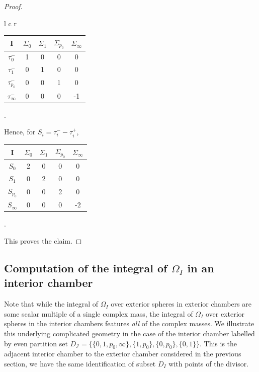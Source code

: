\documentclass[12pt,letterpaper,reqno]{amsart}
\theoremstyle{remark}
\theoremstyle{definition}
\numberwithin{thm}{section}
\numberwithin{equation}{section}
\numberwithin{figure}{section}
\begin{document}
\begin{proof}
\begin{center}
\begin{tabular}{l c r}
\begin{tabular}{  c | c | c |c|c }
    I & $\Sigma_0$ & $\Sigma_1$ & $\Sigma_{p_0}$ & $\Sigma_\infty$ \\ \hline
    $\tau_0^-$ & 1 & 0 & 0 & 0\\ \hline
    $\tau_1^-$ & 0 & 1 & 0 & 0\\ \hline
    $\tau_{p_0}^-$ & 0 & 0  & 1 & 0\\ \hline
    $\tau_\infty^-$ & 0 & 0  & 0 & -1\\
\end{tabular}.

\end{tabular}

\end{center}
Hence,  for $S_i = \tau_i^- - \tau_i^+$,
\begin{center}

 \begin{tabular}{  c | c | c |c|c }
    I & $\Sigma_0$ & $\Sigma_1$ & $\Sigma_{p_0}$ & $\Sigma_\infty$ \\ \hline
    $S_0$ & 2 & 0 & 0 & 0\\ \hline
    $S_1$ & 0 & 2 & 0 & 0\\ \hline
    $S_{p_0}$ & 0 & 0  & 2 & 0\\ \hline
    $S_\infty$ & 0 & 0  & 0 & -2 \\
\end{tabular}.
\end{center}
This proves the claim.
 \end{proof}
 

 \subsection{Computation of the integral of \texorpdfstring{$\Omega_I$}{the holomorphic symplectic form} in an interior chamber}
 
 Note that while the integral of $\Omega_I$ over exterior spheres in exterior chambers are some scalar multiple of a single complex mass, the integral of $\Omega_I$ over exterior spheres in the interior chambers features \emph{all} of the complex masses.  We illustrate this underlying complicated geometry in the case of the interior chamber labelled by even partition set $D_{\mathcal{I}}=\{\{0, 1, p_0, \infty\}, \{1, p_0\}, \{0, p_0\}, \{0, 1\}\}$.
This is the adjacent interior chamber to the exterior chamber considered in the previous section, we have the same identification of subset $D_I$ with points of the divisor.
\end{document}
